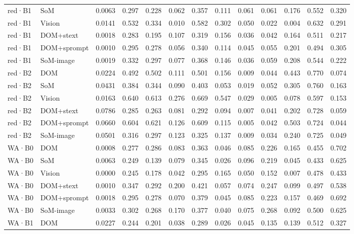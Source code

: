 \begin{table}[tp]
\begin{tabular}{@{}lllllllllllll@{}}
red·B1 & SoM & 0.0063 & 0.297 & 0.228 & 0.062 & 0.357 & 0.111 & 0.061 & 0.061 & 0.176 & 0.552 & 0.320 \\
red·B1 & Vision & 0.0141 & 0.532 & 0.334 & 0.010 & 0.582 & 0.302 & 0.050 & 0.022 & 0.004 & 0.632 & 0.291 \\
red·B1 & DOM+stext & 0.0018 & 0.283 & 0.195 & 0.107 & 0.319 & 0.156 & 0.036 & 0.042 & 0.164 & 0.511 & 0.217 \\
red·B1 & DOM+sprompt & 0.0010 & 0.295 & 0.278 & 0.056 & 0.340 & 0.114 & 0.045 & 0.055 & 0.201 & 0.494 & 0.305 \\
red·B1 & SoM-image & 0.0019 & 0.332 & 0.297 & 0.077 & 0.368 & 0.146 & 0.036 & 0.059 & 0.208 & 0.544 & 0.222 \\
red·B2 & DOM & 0.0224 & 0.492 & 0.502 & 0.111 & 0.501 & 0.156 & 0.009 & 0.044 & 0.443 & 0.770 & 0.074 \\
red·B2 & SoM & 0.0431 & 0.384 & 0.344 & 0.090 & 0.403 & 0.053 & 0.019 & 0.052 & 0.305 & 0.760 & 0.163 \\
red·B2 & Vision & 0.0163 & 0.640 & 0.613 & 0.276 & 0.669 & 0.547 & 0.029 & 0.005 & 0.078 & 0.597 & 0.153 \\
red·B2 & DOM+stext & 0.0786 & 0.285 & 0.263 & 0.081 & 0.292 & 0.094 & 0.007 & 0.041 & 0.202 & 0.728 & 0.059 \\
red·B2 & DOM+sprompt & 0.0660 & 0.604 & 0.621 & 0.126 & 0.609 & 0.115 & 0.005 & 0.042 & 0.503 & 0.724 & 0.044 \\
red·B2 & SoM-image & 0.0501 & 0.316 & 0.297 & 0.123 & 0.325 & 0.137 & 0.009 & 0.034 & 0.240 & 0.725 & 0.049 \\
WA·B0 & DOM & 0.0008 & 0.277 & 0.286 & 0.083 & 0.363 & 0.046 & 0.085 & 0.226 & 0.165 & 0.455 & 0.702 \\
WA·B0 & SoM & 0.0063 & 0.249 & 0.139 & 0.079 & 0.345 & 0.026 & 0.096 & 0.219 & 0.045 & 0.433 & 0.625 \\
WA·B0 & Vision & 0.0000 & 0.245 & 0.178 & 0.042 & 0.295 & 0.165 & 0.050 & 0.152 & 0.007 & 0.478 & 0.433 \\
WA·B0 & DOM+stext & 0.0010 & 0.347 & 0.292 & 0.200 & 0.421 & 0.057 & 0.074 & 0.247 & 0.099 & 0.497 & 0.538 \\
WA·B0 & DOM+sprompt & 0.0018 & 0.295 & 0.278 & 0.070 & 0.379 & 0.045 & 0.085 & 0.223 & 0.157 & 0.469 & 0.692 \\
WA·B0 & SoM-image & 0.0033 & 0.302 & 0.268 & 0.170 & 0.377 & 0.040 & 0.075 & 0.268 & 0.092 & 0.500 & 0.625 \\
WA·B1 & DOM & 0.0227 & 0.244 & 0.201 & 0.038 & 0.289 & 0.026 & 0.045 & 0.135 & 0.139 & 0.512 & 0.327 \\

\end{tabular}
\end{table}
